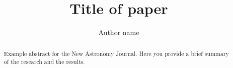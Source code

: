 \documentclass[final,5p,times,twocolumn,authoryear]{elsarticle}
\begin{document}
\begin{frontmatter}



	\title{Title of paper}


	\author[first]{Author name}

	\begin{abstract}
		Example abstract for the New Astronomy Journal. Here you provide a brief summary of the research and the results.
	\end{abstract}




\end{frontmatter}
\end{document}
